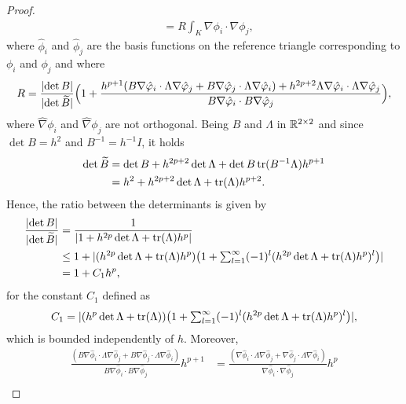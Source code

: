 \documentclass[10pt]{article}
\begin{document}
\begin{proof}
\begin{equation}
\begin{aligned}
		&= R \int_K \nabla \phi_i \cdot \nabla \phi_j,
	\end{aligned}
	\end{equation}
	where $\hat \phi_i$ and $\hat \phi_j$ are the basis functions on the reference triangle corresponding to $\phi_i$ and $\phi_j$ and where
	\begin{equation}
		R = \frac{\lvert\det B\rvert}{\lvert\det\widetilde B\rvert}\Big(1 + \frac{h^{p+1}(B\nabla \hat {\varphi}_i \cdot \Lambda \nabla \hat {\varphi}_j + B\nabla \hat {\varphi}_j \cdot \Lambda \nabla \hat {\varphi}_i) + h^{2p+2} \Lambda \nabla \hat {\varphi}_i \cdot \Lambda \nabla \hat {\varphi}_j}{B \nabla \hat {\varphi}_i \cdot B \nabla \hat {\varphi}_j}\Big),
	\end{equation}
	where $\hat \nabla \phi_i$ and $\hat \nabla \phi_j$ are not orthogonal. Being $B$ and $\Lambda$ in $\mathbb{R}^{2\times 2}$ and since $\det B = h^2$ and $B^{-1} = h^{-1} I$, it holds
	\begin{equation}
	\begin{aligned}
		\det \widetilde B &= \det B + h^{2p+2} \det \Lambda + \det B \operatorname{tr}(B^{-1}\Lambda) h^{p+1} \\
			&= h^2 + h^{2p+2} \det \Lambda + \operatorname{tr}(\Lambda) h^{p+2}.
	\end{aligned}
	\end{equation}
	Hence, the ratio between the determinants is given by
	\begin{equation}
	\begin{aligned}
		\frac{\lvert\det B\rvert}{\lvert\det\widetilde B\rvert} &= \frac{1}{\lvert1 + h^{2p} \det \Lambda + \operatorname{tr}(\Lambda) h^p\rvert}\\
		&\leq 1 + \lvert(h^{2p} \det \Lambda + \operatorname{tr}(\Lambda) h^p)\big(1 + {\textstyle\sum}_{l=1}^\infty(-1)^l (h^{2p} \det \Lambda + \operatorname{tr}(\Lambda) h^p)^l\big)\rvert \\
		&= 1 + C_1 h^p,
	\end{aligned}
	\end{equation}
	for the constant $C_1$ defined as
	\begin{equation}
		C_1 = \lvert(h^p \det \Lambda + \operatorname{tr}(\Lambda))\big(1 + {\textstyle\sum}_{l=1}^\infty(-1)^l (h^{2p} \det \Lambda + \operatorname{tr}(\Lambda) h^p)^l\big)\rvert,
	\end{equation}
	which is bounded independently of $h$. Moreover,
	\begin{equation}
	\begin{aligned}
		\frac{(B\nabla \hat \phi_i \cdot \Lambda \nabla \hat \phi_j + B\nabla \hat \phi_j \cdot \Lambda \nabla \hat \phi_i) }{B \nabla \hat \phi_i \cdot B \nabla \hat \phi_j}h^{p+1}
		&= 	\frac{(\nabla \hat \phi_i \cdot \Lambda \nabla \hat \phi_j + \nabla \hat \phi_j \cdot \Lambda \nabla \hat \phi_i)}{\nabla \hat \phi_i \cdot \nabla \hat \phi_j} h^p\\

\end{aligned}
\end{equation}
\end{proof}
\end{document}

